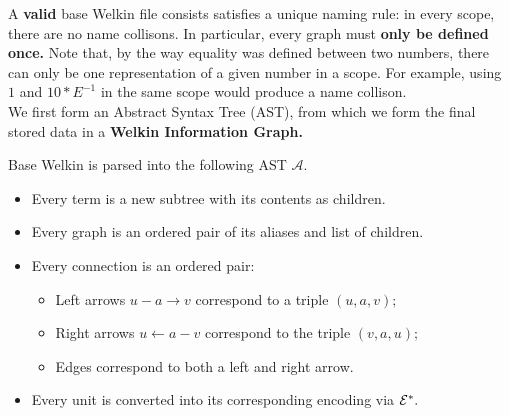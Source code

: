 A \textbf{valid} base Welkin file consists satisfies a unique naming rule: in every scope, there are no name collisons. In particular, every graph must \textbf{only be defined once.} Note that, by the way equality was defined between two numbers,
  there can only be one representation of a given number in a scope. For example, using $1$ and $10*E^{-1}$ in the same scope would produce a name collison.
\\ We first form an Abstract Syntax Tree (AST), from which we form the final stored data in a \textbf{Welkin Information Graph.}
\begin{definition}
  Base Welkin is parsed into the following AST $\mathcal{A}.$
  \begin{itemize}
	\item Every term is a new subtree with its contents as children.
    \item Every graph is an ordered pair of its aliases and list of children.
    \item Every connection is an ordered pair:
		  \begin{itemize}
			\item Left arrows $u - a \to v$ correspond to a triple $(u, a, v);$
			\item Right arrows $u \leftarrow a - v$ correspond to the triple $(v, a, u);$
			\item Edges correspond to both a left and right arrow.
		  \end{itemize}
	\item Every unit is converted into its corresponding encoding via $\mathcal{E}^{*}.$
  \end{itemize}
 \end{definition}
